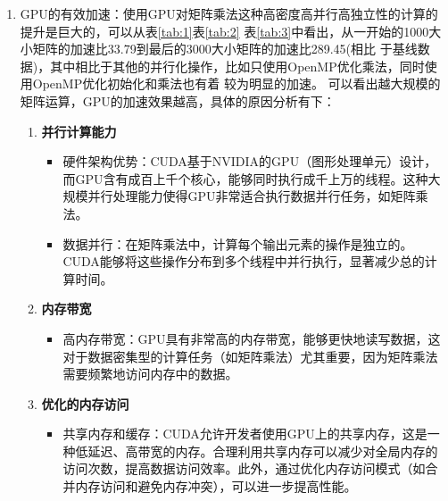 \documentclass{article}
\begin{document}
\begin{enumerate}
    \item GPU的有效加速：使用GPU对矩阵乘法这种高密度高并行高独立性的计算的提升是巨大的，可以从表\ref{tab:1}表\ref{tab:2}
    表\ref{tab:3}中看出，从一开始的1000大小矩阵的加速比33.79到最后的3000大小矩阵的加速比289.45(相比
    于基线数据)，其中相比于其他的并行化操作，比如只使用OpenMP优化乘法，同时使用OpenMP优化初始化和乘法也有着
    较为明显的加速。
    可以看出越大规模的矩阵运算，GPU的加速效果越高，具体的原因分析有下：
    \begin{enumerate}
        \item \textbf{并行计算能力}
        \begin{itemize}
          \item 硬件架构优势：CUDA基于NVIDIA的GPU（图形处理单元）设计，而GPU含有成百上千个核心，能够同时执行成千上万的线程。这种大规模并行处理能力使得GPU非常适合执行数据并行任务，如矩阵乘法。
          \item 数据并行：在矩阵乘法中，计算每个输出元素的操作是独立的。CUDA能够将这些操作分布到多个线程中并行执行，显著减少总的计算时间。
        \end{itemize}
      
        \item \textbf{内存带宽}
        \begin{itemize}
          \item 高内存带宽：GPU具有非常高的内存带宽，能够更快地读写数据，这对于数据密集型的计算任务（如矩阵乘法）尤其重要，因为矩阵乘法需要频繁地访问内存中的数据。
        \end{itemize}
      
        \item \textbf{优化的内存访问}
        \begin{itemize}
          \item 共享内存和缓存：CUDA允许开发者使用GPU上的共享内存，这是一种低延迟、高带宽的内存。合理利用共享内存可以减少对全局内存的访问次数，提高数据访问效率。此外，通过优化内存访问模式（如合并内存访问和避免内存冲突），可以进一步提高性能。
        \end{itemize}
      

\end{enumerate}
\end{enumerate}
\end{document}
